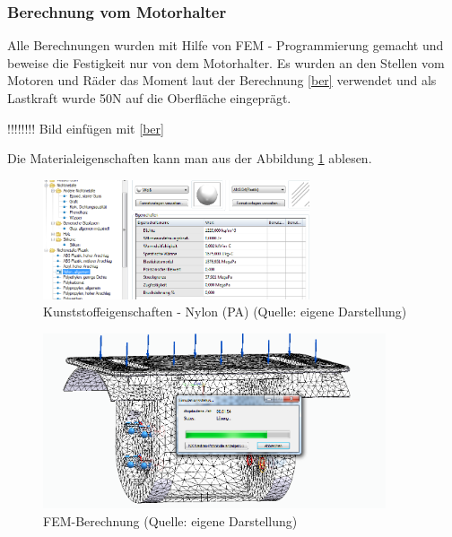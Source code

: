 \subsubsection{ Berechnung vom Motorhalter}

Alle Berechnungen wurden mit Hilfe von FEM - Programmierung gemacht und beweise die Festigkeit nur von dem Motorhalter. Es wurden an den Stellen vom Motoren und Räder das Moment laut der Berechnung \ref{ber} verwendet und als Lastkraft wurde 50N auf die Oberfläche eingeprägt. 

!!!!!!!!   Bild einfügen mit \ref{ber}

Die Materialeigenschaften kann man aus der Abbildung \ref{FEM2} ablesen.

\begin{figure}[!h]  %
	\centering\includegraphics[width=0.7\textwidth]{images/FEM2.png}
	\caption{Kunststoffeigenschaften - Nylon (PA) \newline (Quelle: eigene Darstellung)}
	\label{FEM2} %
\end{figure}

\begin{figure}[!h]  %
	\centering\includegraphics[width=0.9\textwidth]{images/FEM.png}
	\caption{FEM-Berechnung \newline (Quelle: eigene Darstellung)}
	\label{FEM1} %
\end{figure}

